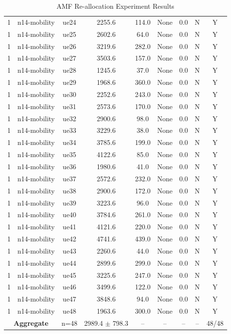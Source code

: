 \begin{table}[ht]
\begin{tabular}{|c|c|c|c|c|c|c|c|c|}
1 & n14-mobility & ue24 & 2255.6 & 114.0 & None & 0.0 & N & Y \\
1 & n14-mobility & ue25 & 2602.6 & 64.0 & None & 0.0 & N & Y \\
1 & n14-mobility & ue26 & 3219.6 & 282.0 & None & 0.0 & N & Y \\
1 & n14-mobility & ue27 & 3503.6 & 157.0 & None & 0.0 & N & Y \\
1 & n14-mobility & ue28 & 1245.6 & 37.0 & None & 0.0 & N & Y \\
1 & n14-mobility & ue29 & 1968.6 & 360.0 & None & 0.0 & N & Y \\
1 & n14-mobility & ue30 & 2252.6 & 243.0 & None & 0.0 & N & Y \\
1 & n14-mobility & ue31 & 2573.6 & 170.0 & None & 0.0 & N & Y \\
1 & n14-mobility & ue32 & 2900.6 & 98.0 & None & 0.0 & N & Y \\
1 & n14-mobility & ue33 & 3229.6 & 38.0 & None & 0.0 & N & Y \\
1 & n14-mobility & ue34 & 3785.6 & 199.0 & None & 0.0 & N & Y \\
1 & n14-mobility & ue35 & 4122.6 & 85.0 & None & 0.0 & N & Y \\
1 & n14-mobility & ue36 & 1980.6 & 41.0 & None & 0.0 & N & Y \\
1 & n14-mobility & ue37 & 2572.6 & 232.0 & None & 0.0 & N & Y \\
1 & n14-mobility & ue38 & 2900.6 & 172.0 & None & 0.0 & N & Y \\
1 & n14-mobility & ue39 & 3223.6 & 96.0 & None & 0.0 & N & Y \\
1 & n14-mobility & ue40 & 3784.6 & 261.0 & None & 0.0 & N & Y \\
1 & n14-mobility & ue41 & 4121.6 & 220.0 & None & 0.0 & N & Y \\
1 & n14-mobility & ue42 & 4741.6 & 439.0 & None & 0.0 & N & Y \\
1 & n14-mobility & ue43 & 2260.6 & 44.0 & None & 0.0 & N & Y \\
1 & n14-mobility & ue44 & 2899.6 & 299.0 & None & 0.0 & N & Y \\
1 & n14-mobility & ue45 & 3225.6 & 247.0 & None & 0.0 & N & Y \\
1 & n14-mobility & ue46 & 3499.6 & 122.0 & None & 0.0 & N & Y \\
1 & n14-mobility & ue47 & 3848.6 & 94.0 & None & 0.0 & N & Y \\
1 & n14-mobility & ue48 & 1963.6 & 300.0 & None & 0.0 & N & Y \\
\multicolumn{2}{|c|}{\textbf{Aggregate}} & n=48 & 2989.4 $\pm$ 798.3 & -- & -- & -- & -- & 48/48 \\
\hline
\end{tabular}
\caption{AMF Re-allocation Experiment Results}
\label{tab:amf_realloc}
\end{table}
